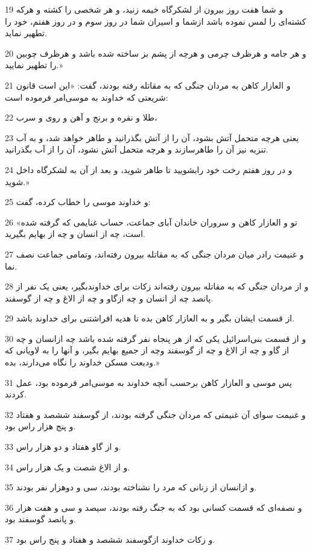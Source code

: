 \par 19 و شما هفت روز بیرون از لشکرگاه خیمه زنید، و هر شخصی را کشته و هر‌که کشته‌ای را لمس نموده باشد ازشما و اسیران شما در روز سوم و در روز هفتم، خود را تطهیر نماید.
\par 20 و هر جامه و هرظرف چرمی و هر‌چه از پشم بز ساخته شده باشد و هرظرف چوبین را تطهیر نمایید.»
\par 21 و العازار کاهن به مردان جنگی که به مقاتله رفته بودند، گفت: «این است قانون شریعتی که خداوند به موسی‌امر فرموده است:
\par 22 طلا و نقره و برنج و آهن و روی و سرب،
\par 23 یعنی هر‌چه متحمل آتش بشود، آن را از آتش بگذرانید و طاهر خواهد شد، و به آب تنزیه نیز آن را طاهرسازند و هر‌چه متحمل آتش نشود، آن را از آب بگذرانید.
\par 24 و در روز هفتم رخت خود رابشویید تا طاهر شوید، و بعد از آن به لشکرگاه داخل شوید.»
\par 25 و خداوند موسی را خطاب کرده، گفت:
\par 26 «تو و العازار کاهن و سروران خاندان آبای جماعت، حساب غنایمی که گرفته شده است، چه از انسان و چه از بهایم بگیرید.
\par 27 و غنیمت رادر میان مردان جنگی که به مقاتله بیرون رفته‌اند، وتمامی جماعت نصف نما.
\par 28 و از مردان جنگی که به مقاتله بیرون رفته‌اند زکات برای خداوندبگیر، یعنی یک نفر از پانصد چه از انسان و چه ازگاو و چه از الاغ و چه از گوسفند.
\par 29 از قسمت ایشان بگیر و به العازار کاهن بده تا هدیه افراشتنی برای خداوند باشد.
\par 30 و از قسمت بنی‌اسرائیل یکی که از هر پنجاه نفر گرفته شده باشد چه ازانسان و چه از گاو و چه از الاغ و چه از گوسفند وچه از جمیع بهایم بگیر، و آنها را به لاویانی که ودیعت مسکن خداوند را نگاه می‌دارند، بده.»
\par 31 پس موسی و العازار کاهن برحسب آنچه خداوند به موسی‌امر فرموده بود، عمل کردند.
\par 32 و غنیمت سوای آن غنیمتی که مردان جنگی گرفته بودند، از گوسفند ششصد و هفتاد و پنج هزار راس بود.
\par 33 و از گاو هفتاد و دو هزار راس. 
\par 34 و از الاغ شصت و یک هزار راس.
\par 35 و ازانسان از زنانی که مرد را نشناخته بودند، سی و دوهزار نفر بودند.
\par 36 و نصفه‌ای که قسمت کسانی بود که به جنگ رفته بودند، سیصد و سی و هفت هزار و پانصد گوسفند بود.
\par 37 و زکات خداوند ازگوسفند ششصد و هفتاد و پنج راس بود.
